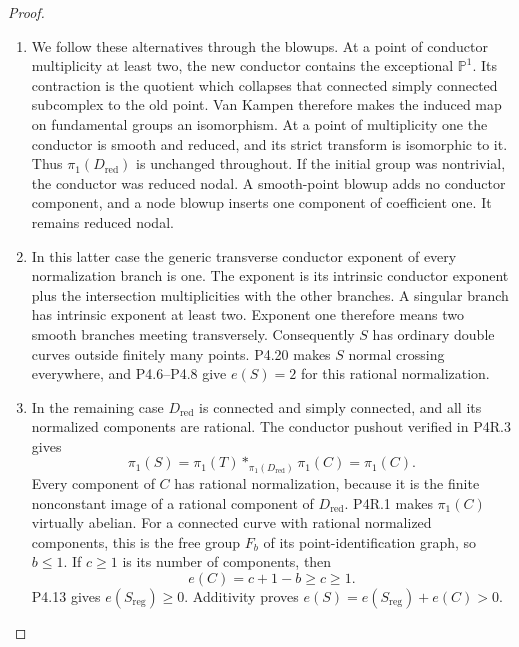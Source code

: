 \begin{proof}
\begin{enumerate}[label={$\langle1\rangle$\arabic*.},leftmargin=*]
\item We follow these alternatives through the blowups. At a
point of conductor multiplicity at least two, the new
conductor contains the exceptional $\mathbb P^1$.
Its contraction is the quotient which collapses that
connected simply connected subcomplex to the old
point. Van Kampen therefore makes the induced map on
fundamental groups an isomorphism. At a point of
multiplicity one the conductor is smooth and reduced,
and its strict transform is isomorphic to it. Thus
$\pi_1(D_{\mathrm{red}})$ is unchanged throughout.
If the initial group was nontrivial, the conductor was
reduced nodal. A smooth-point blowup adds no conductor
component, and a node blowup inserts one component of
coefficient one. It remains reduced nodal.

\item In this latter case the generic transverse conductor
exponent of every normalization branch is one. The
exponent is its intrinsic conductor exponent plus the
intersection multiplicities with the other branches.
A singular branch has intrinsic exponent at least two.
Exponent one therefore means two smooth branches
meeting transversely. Consequently $S$ has ordinary
double curves outside finitely many points. P4.20 makes
$S$ normal crossing everywhere, and P4.6--P4.8 give
$e(S)=2$ for this rational normalization.

\item In the remaining case $D_{\mathrm{red}}$ is connected
and simply connected, and all its normalized components
are rational. The conductor pushout verified in P4R.3
gives
\[
 \pi_1(S)=\pi_1(T)*_{\pi_1(D_{\mathrm{red}})}\pi_1(C)
          =\pi_1(C).
\]
Every component of $C$ has rational normalization,
because it is the finite nonconstant image of a
rational component of $D_{\mathrm{red}}$. P4R.1 makes
$\pi_1(C)$ virtually abelian. For a connected curve
with rational normalized components, this is the free
group $F_b$ of its point-identification graph, so
$b\le1$. If $c\ge1$ is its number of components, then
\[
 e(C)=c+1-b\ge c\ge1.
\]
P4.13 gives $e(S_{\mathrm{reg}})\ge0$. Additivity proves
$e(S)=e(S_{\mathrm{reg}})+e(C)>0$.

\end{enumerate}
\end{proof}
